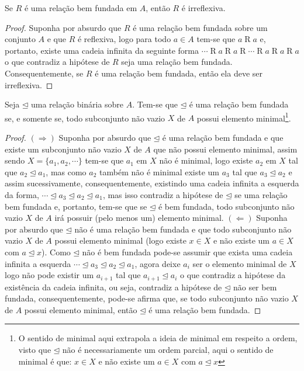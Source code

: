 \begin{proposicao}\label{prop:IrreflexividadeDaRelacaoBemFundada}
	Se $R$ é uma relação bem fundada em $A$, então $R$ é irreflexiva.
\end{proposicao}

\begin{proof}
	Suponha por absurdo que $R$ é uma relação bem fundada sobre um conjunto $A$ e que $R$ é reflexiva, logo para todo $a \in A$ tem-se que $a \mathrel{R} a$ e, portanto, existe uma cadeia infinita da seguinte forma $\cdots \mathrel{R} a \mathrel{R} a\mathrel{R} \cdots \mathrel{R} a \mathrel{R} a \mathrel{R} a$ o que contradiz a hipótese de $R$ seja uma relação bem fundada. Consequentemente, se $R$ é uma relação bem fundada, então ela deve ser irreflexiva.
\end{proof}

\begin{teorema}\label{teo:CaracterizacaoRelacaoBemFundada}
	Seja $\unlhd$ uma relação binária sobre $A$. Tem-se que $\unlhd$ é uma relação bem fundada se, e somente se, todo subconjunto não vazio $X$ de $A$ possui elemento minimal\footnote{O sentido de minimal aqui extrapola a ideia de minimal em respeito a ordem, visto que $\unlhd$ não é necessariamente um ordem parcial, aqui o sentido de minimal é que: $x \in X$ e não existe um $a \in X$ com $a \unlhd x$}.
\end{teorema}

\begin{proof}
	$(\Rightarrow)$ Suponha por absurdo que $\unlhd$ é uma relação bem fundada  e que existe um subconjunto não vazio $X$ de $A$ que não possui elemento minimal, assim sendo $X = \{a_1, a_2, \cdots\}$ tem-se que $a_1$ em $X$ não é minimal, logo existe $a_2$ em $X$ tal que $a_2 \unlhd a_1$, mas como $a_2$ também não é minimal existe um $a_3$ tal que $a_3 \unlhd a_2$ e assim sucessivamente, consequentemente, existindo uma cadeia infinita a esquerda da forma, $\cdots \unlhd a_3 \unlhd a_2 \unlhd a_1$, mas isso contradiz a hipótese de $\unlhd$ se uma relação bem fundada e, portanto, tem-se que se $\unlhd$ é bem fundada, todo subconjunto não vazio $X$ de $A$ irá possuir (pelo menos um) elemento minimal. $(\Leftarrow)$ Suponha por absurdo que $\unlhd$ não é uma relação bem fundada e que todo subconjunto não vazio $X$ de $A$ possui elemento minimal (logo existe $x \in X$ e não existe um $a \in X$ com $a \unlhd x$). Como $\unlhd$ não é bem fundada pode-se assumir que exista uma cadeia infinita a esquerda $\cdots \unlhd a_3 \unlhd a_2 \unlhd a_1$, agora deixe $a_i$ ser o elemento minimal de $X$ logo não pode existir um $a_{i+1}$ tal que $a_{i+1} \unlhd a_i$ o que contradiz a hipótese da existência da cadeia infinita, ou seja, contradiz a hipótese de $\unlhd$ não ser bem fundada, consequentemente, pode-se afirma que, se  todo subconjunto não vazio $X$ de $A$ possui elemento minimal, então $\unlhd$ é uma relação bem fundada.
\end{proof}

